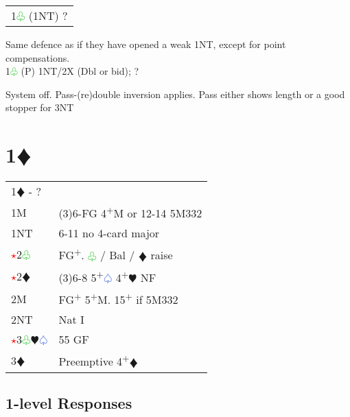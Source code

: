 \documentclass{article}
\renewcommand{\sp}{\textcolor{RoyalBlue}{$\varspade$}}
\newcommand{\he}{\textcolor{RubineRed}{$\varheart$}}
\newcommand{\di}{\textcolor{Peach}{$\vardiamond$}}
\newcommand{\cl}{\textcolor{LimeGreen}{$\varclub$}}
\newcommand{\nt}{\relsize{-1}NT\relsize{1}}
\newcommand{\up}{\textsuperscript{+}}
\newcommand{\al}{\textcolor{red}{$\star$}}
\begin{document}
\medskip

\begin{tabular}{|l|p{6.5cm}}
	\multicolumn{2}{l}{1\cl{} (1\nt{}) ?}\\
\end{tabular}

Same defence as if they have opened a weak 1\nt{}, except for point compensations.\\

1\cl{} (P) 1\nt{}/2X (Dbl or bid); ?

System off. Pass-(re)double inversion applies. Pass either shows length or a good stopper for 3\nt{}

\section{1\di{}}

\begin{tabular}{|l|p{6.5cm}}
	\multicolumn{2}{l}{1\di{} - ?}\\
		1M & (3)6-FG 4\up{}M or 12-14 5M332 \\
		1\nt & 6-11 no 4-card major \\
		\al{}2\cl{} & FG\up{}. \cl{} / Bal / \di{} raise \\
		\al{}2\di{} & (3)6-8 5\up{}\sp{} 4\up{}\he{} NF \\
		2M & FG\up{} 5\up{}M. 15\up{} if 5M332 \\
		2\nt & Nat I \\
		\al{}3\cl{}\he{}\sp{} & 55 GF \\
		3\di{} & Preemptive 4\up\di{} \\
\end{tabular}

\subsection{1-level Responses}
\end{document}
